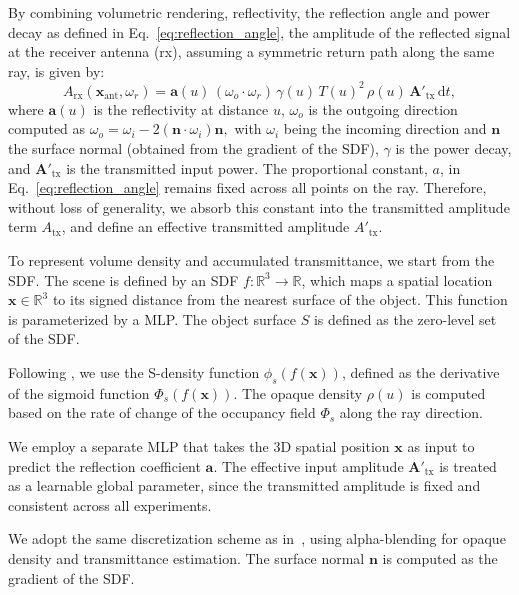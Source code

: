 By combining volumetric rendering, reflectivity, the reflection angle and power decay as defined in Eq.~\ref{eq:reflection_angle}, the amplitude of the reflected signal at the receiver antenna (rx), assuming a symmetric return path along the same ray, is given by:
\begin{equation}
\label{eq:signal_amp_tracing}
A_{\text{rx}} (\mathbf{x}_{\text{ant}}, \omega_r) = \mathbf{a}(u)\, (\omega_o \cdot \omega_r)\, \gamma(u)\, T(u)^2\, \rho(u)\, \mathbf{A}'_{\text{tx}}\, \mathrm{d}t,
\end{equation}
where \( \mathbf{a}(u) \) is the reflectivity at distance \( u \),
\( \omega_o \) is the outgoing direction computed as
\(
\omega_o = \omega_i - 2(\mathbf{n} \cdot \omega_i)\mathbf{n},
\)
with \( \omega_i \) being the incoming direction and \( \mathbf{n} \) the surface normal (obtained from the gradient of the SDF),  \(\gamma\) is the power decay,
and \( \mathbf{A}'_{\text{tx}} \) is the transmitted input power.
The proportional constant, $a$, in Eq.~\ref{eq:reflection_angle} remains fixed across all points on the ray.
Therefore,  without loss of generality, we absorb this constant into the transmitted amplitude term \( A_{\text{tx}} \), and define an effective transmitted amplitude \( A'_{\text{tx}} \).

To represent volume density and accumulated transmittance, we start from the SDF.
The scene is defined by an SDF \( f : \mathbb{R}^3 \to \mathbb{R} \), which maps a spatial location \( \mathbf{x} \in \mathbb{R}^3 \) to its signed distance from the nearest surface of the object.
This function is parameterized by a MLP.
The object surface \( S \) is defined as the zero-level set of the SDF.

Following \citep{wang2021neus}, we use the S-density function \( \phi_s(f(\mathbf{x})) \), defined as the derivative of the sigmoid function \( \Phi_s(f(\mathbf{x})) \).
The opaque density \( \rho(u) \) is computed based on the rate of change of the occupancy field \( \Phi_s \) along the ray direction.

We employ a separate MLP that takes the 3D spatial position \( \mathbf{x} \) as input to predict the reflection coefficient \( \mathbf{a} \).
The effective input amplitude \( \mathbf{A}'_{\text{tx}} \) is treated as a learnable global parameter, since the transmitted amplitude is fixed and consistent across all experiments.

We adopt the same discretization scheme as in~\cite{wang2021neus}, using alpha-blending for opaque density and transmittance estimation.
The surface normal \( \mathbf{n} \) is computed as the gradient of the SDF.

